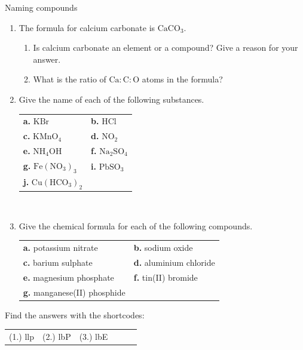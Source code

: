   \label{m38708*secfhsst!!!underscore!!!id255}
            \begin{exercises}{Naming compounds}
{            \nopagebreak \noindent
      \label{m38708*id65118}\begin{enumerate}[noitemsep, label=\textbf{\arabic*}. ] 
\item The formula for calcium carbonate is $\text{CaCO}{}_{3}$.
 \begin{enumerate}[noitemsep, label=\textbf{\alph*}. ] 
\item Is calcium carbonate an element or a compound? Give a reason for your answer.
\item What is the ratio of $\text{Ca}:\text{C}:\text{O}$ atoms in the formula?
\end{enumerate}
\item Give the name of each of the following substances.\\
\begin{tabular}{ll}
\textbf{a.} $\text{KBr}$ & \textbf{b.} $\text{HCl}$ \\
\textbf{c.} ${\text{KMnO}}_{4}$ & \textbf{d.} ${\text{NO}}_{2}$ \\
\textbf{e.} ${\text{NH}}_{4}\text{OH}$ & \textbf{f.} ${\text{Na}}_{2}{\text{SO}}_{4}$ \\
\textbf{g.} ${\text{Fe}}({\text{NO}}_{3})_3$ & \textbf{i.} ${\text{Pb}}{\text{SO}}_{3}$ \\
\textbf{j.} ${\text{Cu}}({\text{HCO}}_{3})_2$ & \\
\end{tabular}\\
\item Give the chemical formula for each of the following compounds.\\
\begin{tabular}{ll}
\textbf{a.} potassium nitrate & \textbf{b.} sodium oxide \\
\textbf{c.} barium sulphate & \textbf{d.} aluminium chloride \\
\textbf{e.} magnesium phosphate & \textbf{f.} tin(II) bromide \\
\textbf{g.} manganese(II) phosphide & \\
\end{tabular}
\end{enumerate}
\practiceinfo
    \label{m38708*cid5}
\par {} Find the answers with the shortcodes:
 \par \begin{tabular}[h]{cccccc}
 (1.) llp  &  (2.) lbP  &  (3.) lbE   & & \end{tabular}}
\end{exercises}
